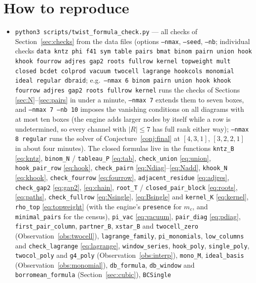 \documentclass[11pt]{article}
\newcommand{\LMPH}[1]{\texttt{#1}}
\begin{document}
\section{How to reproduce}
\begin{itemize}\raggedright
\item \LMPH{python3 scripts/twist\_formula\_check.py} --- all checks of Section~\ref{sec:checks} from the data files
(options \LMPH{--nmax}, \LMPH{--seed}, \LMPH{--nb}; individual checks \LMPH{data kntz phi f41 sym table pairs bmat binom
pairn union hook khook fourrow adjres gap2 roots fullrow kernel topweight mult closed bcdet colprod vacuum twocell
lagrange hookcols monomial ideal regular dbraid}; e.g.\ \LMPH{--nmax 6 binom pairn union hook khook fourrow
adjres gap2 roots fullrow kernel} runs the checks of Sections \ref{sec:N}--\ref{sec:pairs} in under a minute, \LMPH{--nmax 7} extends
them to seven boxes, and \LMPH{--nmax 7 --nb 10} imposes the vanishing conditions on all diagrams with at most ten boxes
(the engine adds larger nodes by itself while a row is undetermined, so every channel with $|R|\le7$ has full rank
either way); \LMPH{--nmax 8 regular} runs the solver of Conjecture~\ref{conj:final} at $[4,3,1]$, $[3,2,2,1]$ in about
four minutes).
The closed formulas live in the functions \LMPH{kntz\_B} \eqref{eq:kntz}, \LMPH{binom\_N} / \LMPH{tableau\_P}
\eqref{eq:tab}, \LMPH{check\_union} \eqref{eq:union}, \LMPH{hook\_pair\_row} \eqref{eq:hook}, \LMPH{check\_pairn}
\eqref{eq:Ndiag}--\eqref{eq:Nadd}, \LMPH{khook\_N} \eqref{eq:khook}, \LMPH{check\_fourrow} \eqref{eq:fourrow},
\LMPH{adjacent\_residue} \eqref{eq:adjres}, \LMPH{check\_gap2} \eqref{eq:gap2}, \eqref{eq:chain}, \LMPH{root\_T} /
\LMPH{closed\_pair\_block} \eqref{eq:roots}, \eqref{eq:paths}, \LMPH{check\_fullrow} \eqref{eq:Nsingle}, \eqref{eq:Bsingle} and
\LMPH{kernel\_K} \eqref{eq:kernel}, \LMPH{rho\_top} \eqref{eq:topweight} (with the engine's \LMPH{presence} for $m_c$,
and \LMPH{minimal\_pairs} for the census), \LMPH{pi\_vac} \eqref{eq:vacuum},
\LMPH{pair\_diag} \eqref{eq:pdiag}, \LMPH{first\_pair\_column}, \LMPH{partner\_B}, \LMPH{xstar\_B} and \LMPH{twocell\_zero}
(Observation~\ref{obs:twocell}), \LMPH{lagrange\_family}, \LMPH{pi\_monomials}, \LMPH{low\_columns} and
\LMPH{check\_lagrange} \eqref{eq:lagrange}, \LMPH{window\_series}, \LMPH{hook\_poly}, \LMPH{single\_poly},
\LMPH{twocol\_poly} and \LMPH{g4\_poly} (Observation~\ref{obs:interp}), \LMPH{mono\_M}, \LMPH{ideal\_basis} (Observation~\ref{obs:monomial}),
\LMPH{db\_formula}, \LMPH{db\_window} and \LMPH{borromean\_formula} (Section~\ref{sec:cubic}), \LMPH{BCSingle}

\end{itemize}
\end{document}
